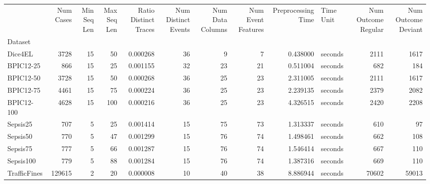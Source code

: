\begin{tabular}{lrrrrrrrrlrr}
 & Num Cases & Min Seq Len & Max Seq Len & Ratio Distinct Traces & Num Distinct Events & Num Data Columns & Num Event Features & Preprocessing Time & Time Unit & Num Outcome Regular & Num Outcome Deviant \\
Dataset &  &  &  &  &  &  &  &  &  &  &  \\
Dice4EL & 3728 & 15 & 50 & 0.000268 & 36 & 9 & 7 & 0.438000 & seconds & 2111 & 1617 \\
BPIC12-25 & 866 & 15 & 25 & 0.001155 & 32 & 23 & 21 & 0.511004 & seconds & 682 & 184 \\
BPIC12-50 & 3728 & 15 & 50 & 0.000268 & 36 & 25 & 23 & 2.311005 & seconds & 2111 & 1617 \\
BPIC12-75 & 4461 & 15 & 75 & 0.000224 & 36 & 25 & 23 & 2.239135 & seconds & 2379 & 2082 \\
BPIC12-100 & 4628 & 15 & 100 & 0.000216 & 36 & 25 & 23 & 4.326515 & seconds & 2420 & 2208 \\
Sepsis25 & 707 & 5 & 25 & 0.001414 & 15 & 75 & 73 & 1.313337 & seconds & 610 & 97 \\
Sepsis50 & 770 & 5 & 47 & 0.001299 & 15 & 76 & 74 & 1.498461 & seconds & 662 & 108 \\
Sepsis75 & 777 & 5 & 66 & 0.001287 & 15 & 76 & 74 & 1.546414 & seconds & 667 & 110 \\
Sepsis100 & 779 & 5 & 88 & 0.001284 & 15 & 76 & 74 & 1.387316 & seconds & 669 & 110 \\
TrafficFines & 129615 & 2 & 20 & 0.000008 & 10 & 40 & 38 & 8.886944 & seconds & 70602 & 59013 \\
\end{tabular}
